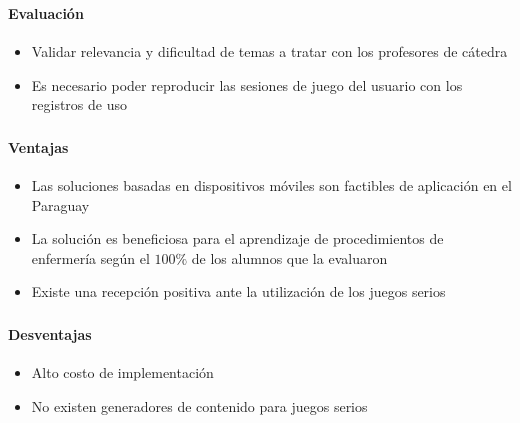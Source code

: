 \begin{frame}
\frametitle{\pagetitle}
\framesubtitle{Evaluación}
\begin{itemize}[<+->]

\item Validar relevancia y dificultad de temas a tratar con los profesores de
cátedra

\item Es necesario poder reproducir las sesiones de juego del usuario con los
registros de uso

\end{itemize}
\end{frame}

\begin{frame}
\frametitle{\pagetitle}
\framesubtitle{Ventajas}
\begin{itemize}[<+->]


\item Las soluciones basadas en dispositivos móviles son factibles de aplicación en el Paraguay

\item La solución es beneficiosa para el aprendizaje de procedimientos de enfermería según el $100\%$ de los alumnos que la evaluaron


\item Existe una recepción positiva ante la utilización de los juegos serios


\end{itemize}
\end{frame}

\begin{frame}
\frametitle{\pagetitle}
\framesubtitle{Desventajas}
\begin{itemize}[<+->]

\item Alto costo de implementación

\item No existen generadores de contenido para juegos serios



\end{itemize}
\end{frame}
